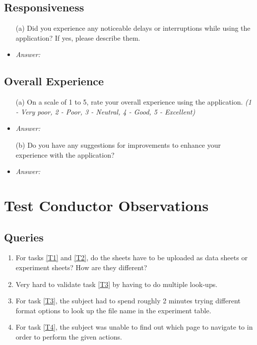 \documentclass{article}
\begin{document}
\subsection*{\textbf{Responsiveness}}
  \begin{itemize}
    \item[(a)] Did you experience any noticeable delays or interruptions while
    using the application? If yes, please describe them.
    \item \emph{Answer:}
  \end{itemize}

\subsection*{\textbf{Overall Experience}}
  \begin{itemize}
    \item[(a)] On a scale of 1 to 5, rate your overall experience using the
    application. \textit{(1 - Very poor, 2 - Poor, 3 - Neutral, 4 - Good, 5 -
    Excellent)}
    \item \emph{Answer:}
    \item[(b)] Do you have any suggestions for improvements to enhance your
    experience with the application?
    \item \emph{Answer:}
  \end{itemize}

\section{Test Conductor Observations}
\subsection{Queries}
\begin{enumerate}
  \item For tasks \ref{T1} and \ref{T2}, do the sheets have to be uploaded as data sheets or experiment sheets? How 
  are they different? \label{Q1} 
  \item Very hard to validate task \ref{T3} by having to do multiple look-ups. \label{Q2}
  \item For task \ref{T3}, the subject had to spend roughly 2 minutes trying different format options to look up the file name in the 
  experiment table. \label{Q3}
  \item For task \ref{T4}, the subject was unable to find out which page to navigate to in order to perform the given actions. \label{Q4}
\end{enumerate}
\end{document}
